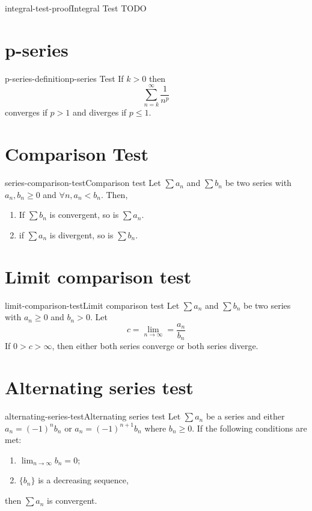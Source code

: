 \documentclass[preview]{standalone}
\begin{document}
\begin{snippetproof}{integral-test-proof}{Integral Test}{
    TODO
}
\end{snippetproof}

\section{p-series}

\begin{snippetdefinition}{p-series-definition}{p-series Test}
    If \(k > 0\) then \[\sum_{n=k}^\infty \frac{1}{n^p}\]
    converges if \(p > 1\) and diverges if \(p \leq 1\).
\end{snippetdefinition}

\section{Comparison Test}

\begin{snippettheorem}{series-comparison-test}{Comparison test}
    Let \(\sum a_n\) and \(\sum b_n\) be two series with \(a_n, b_n \geq 0\)
    and \(\forall n, a_n < b_n\). Then,
    \begin{enumerate}
        \item If \(\sum b_n\) is convergent, so is \(\sum a_n\).
        \item if \(\sum a_n\) is divergent, so is \(\sum b_n\).
    \end{enumerate}
\end{snippettheorem}

\section{Limit comparison test}

\begin{snippettheorem}{limit-comparison-test}{Limit comparison test}
    Let \(\sum a_n\) and \(\sum b_n\) be two series with \(a_n \geq 0\)
    and \(b_n > 0\). Let
    \[ c = \lim_{n \to \infty} = \frac{a_n}{b_n} \]
    If \(0 > c > \infty\), then either both series converge or both series diverge.
\end{snippettheorem}

\section{Alternating series test}

\begin{snippettheorem}{alternating-series-test}{Alternating series test}
    Let \(\sum a_n\) be a series
    and either \(a_n = {(-1)}^n b_n\) or \(a_n = {(-1)}^{n+1} b_n\)
    where \(b_n \geq 0\).
    If the following conditions are met:
    \begin{enumerate}
        \item \(\lim_{n \to \infty} b_n = 0\);
        \item \(\{b_n\}\) is a decreasing sequence,
    \end{enumerate}
    then \(\sum a_n\) is convergent.
\end{snippettheorem}

\end{document}
